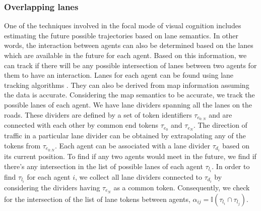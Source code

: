 \documentclass{article}
\begin{document}
\subsubsection{Overlapping lanes}
One of the techniques involved in the focal mode of visual cognition includes estimating the future possible trajectories based on lane semantics. In other words, the interaction between agents can also be determined based on the lanes which are available in the future for each agent. Based on this information, we can track if there will be any possible intersection of lanes between two agents for them to have an interaction. Lanes for each agent can be found using lane tracking algorithms \cite{NGUYEN2018822}\cite{lane}. %
They can also be derived from map information assuming the data is accurate. Considering the map semantics to be accurate, we track the possible lanes of each agent. We have lane dividers spanning all the lanes on the roads. These dividers are defined by a set of token identifiers $\tau_{e_{0:N}}$ and are connected with each other by common end tokens $\tau_{e_0}$ and $\tau_{e_N}$. The direction of traffic in a particular lane divider can be obtained by extrapolating any of the tokens from $\tau_{e_{0:N}}$. Each agent can be associated with a lane divider $\tau_{d_i}$ based on its current position. To find if any two agents would meet in the future, we find if there's any intersection in the list of possible lanes of each agent $\tau_{l_i}$. In order to find $\tau_{l_i}$ for each agent $i$, we collect all lane dividers connected to $\tau_{d_i}$ by considering the dividers having $\tau_{e_N}$ as a common token. Consequently, we check for the intersection of the list of lane tokens between agents, $\alpha_{ij} = \mathbb{I}(\tau_{l_i} \cap \tau_{l_j})$.%



\end{document}
